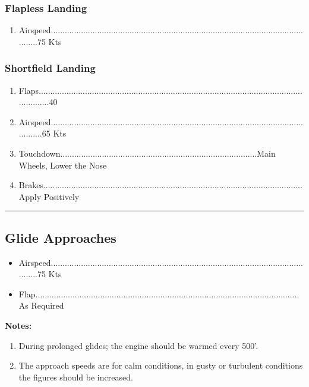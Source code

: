 \documentclass[a4paper]{article}
\newenvironment{checklist}{
  \begin{itemize}[leftmargin=*, align=left]
    \setlength{\itemsep}{2pt}
    \setlength{\parskip}{0pt}
    \setlength{\parsep}{0pt}
}{
  \end{itemize}
}
\newenvironment{numberedchecklist}{
  \begin{enumerate}[label=\arabic*., leftmargin=*, align=left]
    \setlength{\itemsep}{2pt}
    \setlength{\parskip}{0pt}
    \setlength{\parsep}{0pt}
}{
  \end{enumerate}
}
\begin{document}
\subsubsection*{Flapless Landing}
\begin{numberedchecklist}
\item Airspeed.....................................................................................................................75 Kts
\end{numberedchecklist}

\subsubsection*{Shortfield Landing}
\begin{numberedchecklist}
\item Flaps...............................................................................................................................40\textdegree{}
\item Airspeed.......................................................................................................................65 Kts
\item Touchdown.....................................................................................Main Wheels, Lower the Nose
\item Brakes................................................................................................................Apply Positively
\end{numberedchecklist}

\rule{\linewidth}{0.4pt}

\subsection*{Glide Approaches}
\begin{checklist}
\item Airspeed.....................................................................................................................75 Kts
\item Flap..................................................................................................................As Required
\end{checklist}

\textbf{Notes:}
\begin{numberedchecklist}
\item During prolonged glides; the engine should be warmed every 500’.
\item The approach speeds are for calm conditions, in gusty or turbulent conditions the figures should be increased.
\end{numberedchecklist}
\end{document}
